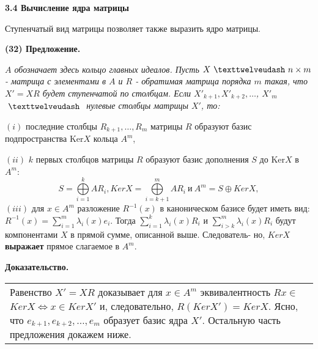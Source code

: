 \documentclass{mai_book}
\begin{document}
	\pagebreak
	
	
	\noindent
	{\large {\bf 3.4 Вычисление ядра матрицы}}
	
	\noindent
	Ступенчатый вид матрицы позволяет также выразить ядро матрицы.
	
	\noindent
	{\bf (32) Предложение.}
	
	{\it $A$ обозначает здесь кольцо главных идеалов. Пусть $X \ \texttwelveudash \  n\times m$-\linebreak
	матрица с элементами в $A$ и $R$ - обратимая матрица порядка $m$ такая,\linebreak
	что $X' = XR$ будет ступенчатой по столбцам. Если $X'_{k + 1}, X'_{k + 2}, \ldots$,\linebreak
	$X'_{m}$ $\ \texttwelveudash \ $ нулевые столбцы матрицы $X'$, то:
	
	$(i)$ последние столбцы $R_{k + 1}, \ldots, R_{m}$ матрицы $R$ образуют базис\linebreak
	подпространства Ker$X$ кольца $A^m$,
	
	$(ii)$ $k$ первых столбцов матрицы $R$ образуют базис дополнения $S$ до\linebreak
	Ker$X$ в $A^m$:
	$$S = \bigoplus\limits_{i = 1}^k AR_i, KerX = \bigoplus\limits_{i = k + 1}^m AR_i \ \text{и} \ A^m = S \oplus KerX,$$
	$(iii)$ для $x \in A^m$ разложение $R^{-1}(x)$ в каноническом базисе будет\linebreak
	иметь вид: $R^{-1}(x) = \sum_{i = 1}^m \lambda_i (x)e_i$. Тогда $\sum_{i = 1}^k \lambda_i (x)R_i$ и $\sum_{i > k}^m \lambda_i (x)R_i$\linebreak
	будут компонентами $X$ в прямой сумме, описанной выше. Следователь-\linebreak
	но, $KerX$ {\bf выражает} прямое слагаемое в $A^m$.}
	
	\noindent
	{\bf Доказательство.}
	
	\begin{tabular}{|p{12.5cm}}
	Равенство $X' = XR$ доказывает для $x\in A^m$ эквивалентность $Rx\in$\linebreak
	$KerX \Longleftrightarrow x\in KerX'$ и, следовательно, $R(KerX') = KerX$. Ясно,\linebreak
	что $e_{k + 1}, e_{k + 2}, \ldots, e_{m}$ образует базис ядра $X'$. Остальную часть\linebreak
	предложения докажем ниже.
	\end{tabular}
\end{document}
